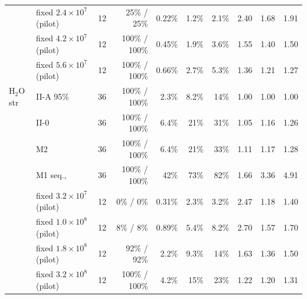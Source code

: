 \documentclass[11pt]{article}
\begin{document}
\begin{table}[!htb]
{\begin{tabular}{llrrrrrrrr}
 & fixed $2.4\times10^{7}$ (pilot) & 12 & 25\% / 25\% & 0.22\% & 1.2\% & 2.1\% & 2.40 & 1.68 & 1.91 \\
 & fixed $4.2\times10^{7}$ (pilot) & 12 & 100\% / 100\% & 0.45\% & 1.9\% & 3.6\% & 1.55 & 1.40 & 1.50 \\
 & fixed $5.6\times10^{7}$ (pilot) & 12 & 100\% / 100\% & 0.66\% & 2.7\% & 5.3\% & 1.36 & 1.21 & 1.27 \\
\midrule
H$_2$O str & II-A 95\% & 36 & 100\% / 100\% & 2.3\% & 8.2\% & 14\% & 1.00 & 1.00 & 1.00 \\
 & II-0 & 36 & 100\% / 100\% & 6.4\% & 21\% & 31\% & 1.05 & 1.16 & 1.26 \\
 & M2 & 36 & 100\% / 100\% & 6.4\% & 21\% & 33\% & 1.11 & 1.17 & 1.28 \\
 & M1 seq., & 36 & 100\% / 100\% & 42\% & 73\% & 82\% & 1.66 & 3.36 & 4.91 \\
 & fixed $3.2\times10^{7}$ (pilot) & 12 & 0\% / 0\% & 0.31\% & 2.3\% & 3.2\% & 2.47 & 1.18 & 1.40 \\
 & fixed $1.0\times10^{8}$ (pilot) & 12 & 8\% / 8\% & 0.89\% & 5.4\% & 8.2\% & 2.70 & 1.57 & 1.70 \\
 & fixed $1.8\times10^{8}$ (pilot) & 12 & 92\% / 92\% & 2.2\% & 9.3\% & 14\% & 1.63 & 1.36 & 1.50 \\
 & fixed $3.2\times10^{8}$ (pilot) & 12 & 100\% / 100\% & 4.2\% & 15\% & 23\% & 1.22 & 1.20 & 1.31 \\
\bottomrule
\end{tabular}}
\end{table}
\end{document}
